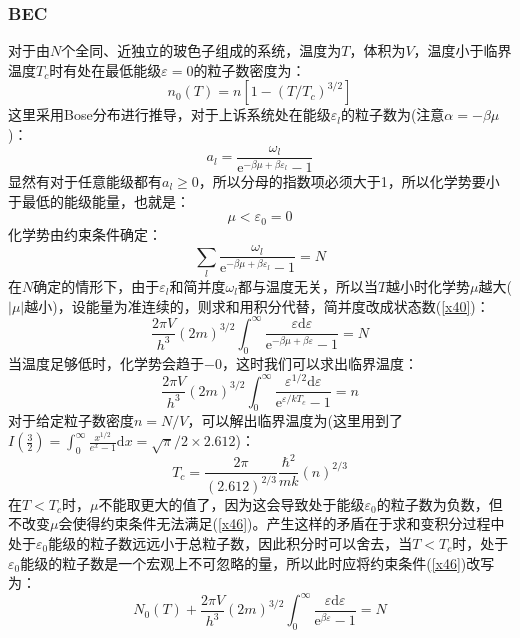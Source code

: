\documentclass[12pt]{article}
\begin{document}
\subsubsection{BEC}
对于由$N$个全同、近独立的玻色子组成的系统，温度为$T$，体积为$V$，温度小于临界温度$T_c$时有处在最低能级$\varepsilon=0$的粒子数密度为：
\begin{equation}
	n_0(T)=n[1-(T/T_c)^{3/2}]
	\label{x47}
\end{equation}
这里采用Bose分布进行推导，对于上诉系统处在能级$\varepsilon_l$的粒子数为(注意$\alpha=-\beta\mu$)：
\begin{equation}
	a_l=\frac{\omega_l}{\mathrm{e}^{-\beta\mu+\beta \varepsilon_l }-1}
\end{equation}
显然有对于任意能级都有$a_l\ge 0$，所以分母的指数项必须大于1，所以化学势要小于最低的能级能量，也就是：
\begin{equation}
	\mu<\varepsilon_0=0
\end{equation}
化学势由约束条件确定：
\begin{equation}
	\sum_l \frac{\omega_l}{\mathrm{e}^{-\beta\mu+\beta \varepsilon_l}-1}=N
\end{equation}
在$N$确定的情形下，由于$\varepsilon_l$和简并度$\omega_l$都与温度无关，所以当$T$越小时化学势$\mu$越大($|\mu|$越小)，设能量为准连续的，则求和用积分代替，简并度改成状态数(\ref{x40})：
\begin{equation}
	\frac{2\pi V}{h^3}(2m)^{3/2}\int_{0}^{\infty} \frac{\varepsilon\mathrm{d}\varepsilon}{\mathrm{e}^{-\beta\mu+\beta\varepsilon}-1}=N
	\label{x46}
\end{equation}
当温度足够低时，化学势会趋于$-0$，这时我们可以求出临界温度：
\begin{equation}
	\frac{2\pi V}{h^3}(2m)^{3/2}\int_{0}^{\infty}\frac{\varepsilon^{1/2}\mathrm{d}\varepsilon}{\mathrm{e}^{\varepsilon/kT_c}-1}=n
\end{equation}
对于给定粒子数密度$n=N/V$，可以解出临界温度为(这里用到了$I(\frac{3}{2})=\int_{0}^{\infty} \frac{x^{1/2}}{e^x-1}\mathrm{d}x=\sqrt{\pi}/2\times 2.612$)：
\begin{equation}
	T_c=\frac{2\pi}{(2.612)^{2/3}}\frac{\hbar^2}{mk}(n)^{2/3}
\end{equation}
在$T<T_c$时，$\mu$不能取更大的值了，因为这会导致处于能级$\varepsilon_0$的粒子数为负数，但不改变$\mu$会使得约束条件无法满足(\ref{x46})。产生这样的矛盾在于求和变积分过程中处于$\varepsilon_0$能级的粒子数远远小于总粒子数，因此积分时可以舍去，当$T<T_c$时，处于$\varepsilon_0$能级的粒子数是一个宏观上不可忽略的量，所以此时应将约束条件(\ref{x46})改写为：
\begin{equation}
	N_0(T)+\frac{2\pi V}{h^3}(2m)^{3/2}\int_{0}^{\infty} \frac{\varepsilon\mathrm{d}\varepsilon}{\mathrm{e}^{\beta\varepsilon}-1}=N
\end{equation}
\end{document}
